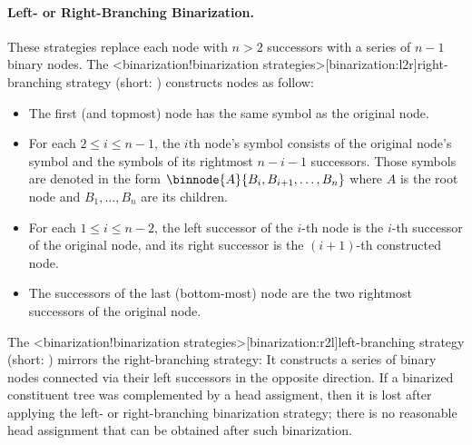 \documentclass[../../document.tex]{subfiles}
\begin{document}
    \paragraph{Left- or Right-Branching Binarization.}
    These strategies replace each node with \( n>2 \) successors with a series of \( n-1 \) binary nodes.
    The <binarization!binarization strategies>[binarization:l2r]{right-branching strategy} (short: ) constructs nodes as follow:
    \begin{itemize}
        \item The first (and topmost) node has the same symbol as the original node.
        \item For each \(2 \leq i \leq n-1\), the \(i\)th node's symbol consists of the original node's symbol and the symbols of its rightmost \(n-i-1\) successors. Those symbols are denoted in the form \(\binnode{A}{B_i,B_{i+1},\ldots,B_n}\) where \(A\) is the root node and \(B_1, \ldots, B_n\) are its children.
        \item For each \(1 \leq i \leq n-2\), the left successor of the \(i\)-th node is the \(i\)-th successor of the original node, and its right successor is the \((i+1)\)-th constructed node.
        \item The successors of the last (bottom-most) node are the two rightmost successors of the original node.
    \end{itemize}
    The <binarization!binarization strategies>[binarization:r2l]{left-branching strategy} (short: ) mirrors the right-branching strategy: It constructs a series of binary nodes connected via their left successors in the opposite direction.
    If a binarized constituent tree was complemented by a head assigment, then it is lost after applying the left- or right-branching binarization strategy; there is no reasonable head assignment that can be obtained after such binarization.
\end{document}
